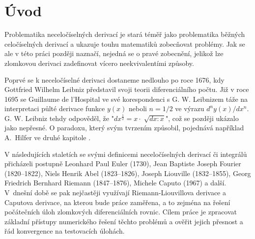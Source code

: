 \documentclass[a4paper,12pt,twoside]{article}
\theoremstyle{definition}
\theoremstyle{remark}
\numberwithin{equation}{section}
\numberwithin{table}{section}
\numberwithin{figure}{section}
\begin{document}
\newpage
\pagestyle{fancy}
\setlength{\headheight}{13.78807pt}
\renewcommand{\headrulewidth}{0.4pt}
\renewcommand{\sectionmark}[1]{\markboth{\thesection~  #1}{} }
\fancyhead[LO,RE]{\small\textit{\nouppercase{\leftmark}}}
\fancyhead[LE,RO]{\small\thepage}
\fancyfoot[LE,RO]{\empty}
\fancyfoot[CE,CO]{\empty}


\newpage
\tableofcontents
\newpage


\section{Úvod}

Problematika neceločíselných derivací je stará téměř jako problematika běžných celočíselných derivací a ukazuje touhu matematiků zobecňovat problémy. Jak se ale v této práci později naznačí, nejedná se o pravé zobecnění, jelikož lze zlomkovou derivaci zadefinovat vícero neekvivalentími způsoby. 

Poprvé se k neceločíselné derivaci dostaneme nedlouho po roce 1676, kdy Gottfried Wilhelm Leibniz představil svoji teorii diferenciálního počtu. Již v roce 1695 se Guillaume de l'Hospital ve své korespondenci s G. W. Leibnizem táže na interpretaci půlté derivace funkce $y\left(x\right)$ neboli  $n = 1/2$ ve výrazu ${d^{n}y\left(x\right)}/{dx^{n}}$. G. W. Leibniz tehdy odpověděl, že "$dx^{\frac{1}{2}} = x \cdot \sqrt[]{dx :x}$", což se později ukázalo jako nepřesné. O paradoxu, který svým tvrzením způsobil, pojednává například A.~Hilfer ve druhé kapitole \cite{LeibnitzFail}.

V následujících staletích se svými definicemi neceločíselných derivací či integrálů přicházeli postupně Leonhard Paul Euler (1730), Jean Baptiste Joseph Fourier (1820--1822), Niels Henrik Abel (1823--1826), Joseph Liouville (1832--1855), Georg Friedrich Bernhard Riemann  (1847--1876), Michele Caputo (1967)  a další. 
V~dnešní době se pak nejčastěji využívají Riemann-Liouvillova derivace a Caputova derivace, na kterou bude práce zaměřena, a to zejména na řešení počátečních úloh zlomkových diferenciálních rovnic. Cílem práce je zpracovat základní přístupy numerického řešení těchto problémů a ověřit jejich přesnost a řád konvergence na testovacích úlohách.
\end{document}

